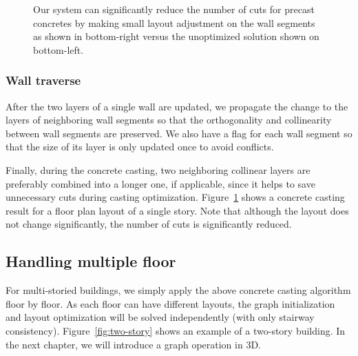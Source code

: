\begin{figure}[t!]
\centering
{}
\caption{Our system can significantly reduce the number of cuts for precast concretes by making small layout adjustment on the wall segments as shown in bottom-right versus the unoptimized solution shown on bottom-left.}
\label{precast}
\end{figure}

\subsubsection{Wall traverse}

After the two layers of a single wall are updated, we propagate the change to the layers of neighboring wall segments so that the orthogonality and collinearity between wall segments are preserved. We also have a flag for each wall segment so that the size of its layer is only updated once to avoid conflicts.

Finally, during the concrete casting, two neighboring collinear layers are preferably combined into a longer one, if applicable, since it helps to save unnecessary cuts during casting optimization. Figure~\ref{precast} shows a concrete casting result for a floor plan layout of a single story. Note that although the layout does not change significantly, the number of cuts is significantly reduced.

\subsection{Handling multiple floor}

For multi-storied buildings, we simply apply the above concrete casting algorithm floor by floor. As each floor can have different layouts, the graph initialization and layout optimization will be solved independently (with only stairway consistency). Figure~\ref{fig:two-story} shows an example of a two-story building. In the next chapter, we will introduce a graph operation in 3D.

